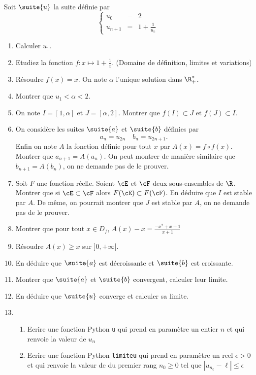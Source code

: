 \documentclass[a4paper, 11pt,reqno]{article}
\begin{document}
\begin{exercice} 
Soit $\suite{u}$ la suite définie par 
$$\left\{ 
\begin{array}{ccl}
u_0&=&2\\
u_{n+1} &=&1 +\frac{1}{u_n}
\end{array}
\right.$$

\begin{enumerate}
\item Calculer $u_1$.
\item Etudiez la fonction $f: x\mapsto 1+\frac{1}{x}$. (Domaine de définition, limites et variations) 
\item Résoudre $f(x)=x$. On note $\alpha$ l'unique solution dans $\R^*_+$. 
\item Montrer que $u_1<\alpha <2$.
\item On note $I=[1,\alpha]$ et $J=[\alpha,2]$. Montrer que $f(I)\subset J$ et $f(J)\subset I$.
\item On considère les suites $\suite{a}$ et  $\suite{b}$ définies par 
$$a_n=u_{2n} \quad b_n =u_{2n+1}.$$
Enfin on note $A$ la fonction définie pour tout $x$ par $A(x)=f\circ f(x)$.
 Montrer que $a_{n+1} =A (a_n)$. On peut montrer de manière similaire que 
 $b_{n+1} =A(b_n) $, on ne demande pas de le prouver. 
 \item Soit $F$ une fonction réelle. Soient $\cE $ et $\cF$ deux sous-ensembles de $\R$. Montrer que si $\cE\subset \cF$ alors $F(\cE)\subset F(\cF)$. En déduire que  $I$ est stable par $A$. De même, on pourrait montrer que $J$ est stable par $A$, on ne demande pas de le prouver. 
\item Montrer que pour tout $x\in D_f$, $A(x)-x =\frac{-x^2+x+1}{x+1}$ 
\item Résoudre $A(x)\geq x$ sur $]0,+\infty[$. 
\item  En déduire que $\suite{a}$ est décroissante et $\suite{b}$ est croissante. 
\item Montrer que $\suite{a}$ et $\suite{b}$ convergent, calculer leur limite. 
\item En déduire que $\suite{u}$ converge et calculer sa limite. 
\item \begin{enumerate}
\item Ecrire une fonction Python \texttt{u} qui prend en paramètre un entier $n$ et qui renvoie la valeur de $u_n$
\item Ecrire une fonction Python \texttt{limiteu} qui prend en paramètre un reel $\epsilon>0$ et  qui renvoie la valeur de du premier rang $n_0\geq 0$ tel que $|u_{n_0} -\ell|\leq \epsilon$ 
\end{enumerate}

\end{enumerate}

\end{exercice}
\end{document}
